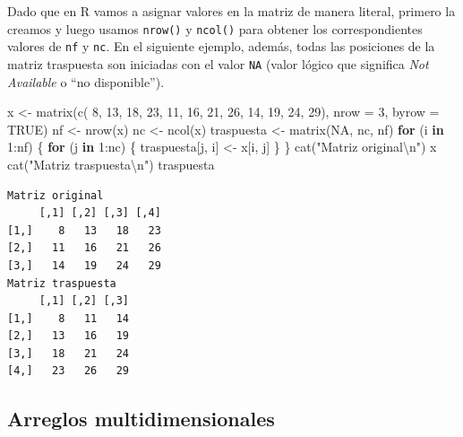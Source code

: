 \documentclass[
]{book}
\newenvironment{Shaded}{\begin{snugshade}}{\end{snugshade}}
\newcommand{\AttributeTok}[1]{\textcolor[rgb]{0.77,0.63,0.00}{#1}}
\newcommand{\ConstantTok}[1]{\textcolor[rgb]{0.00,0.00,0.00}{#1}}
\newcommand{\ControlFlowTok}[1]{\textcolor[rgb]{0.13,0.29,0.53}{\textbf{#1}}}
\newcommand{\DecValTok}[1]{\textcolor[rgb]{0.00,0.00,0.81}{#1}}
\newcommand{\FunctionTok}[1]{\textcolor[rgb]{0.00,0.00,0.00}{#1}}
\newcommand{\NormalTok}[1]{#1}
\newcommand{\OtherTok}[1]{\textcolor[rgb]{0.56,0.35,0.01}{#1}}
\newcommand{\SpecialCharTok}[1]{\textcolor[rgb]{0.00,0.00,0.00}{#1}}
\newcommand{\StringTok}[1]{\textcolor[rgb]{0.31,0.60,0.02}{#1}}
\begin{document}
Dado que en R vamos a asignar valores en la matriz de manera literal, primero la creamos y luego usamos \texttt{nrow()} y \texttt{ncol()} para obtener los correspondientes valores de \texttt{nf} y \texttt{nc}. En el siguiente ejemplo, además, todas las posiciones de la matriz traspuesta son iniciadas con el valor \texttt{NA} (valor lógico que significa \emph{Not Available} o ``no disponible'').

\begin{Shaded}
\begin{Highlighting}[]
\NormalTok{x }\OtherTok{\textless{}{-}} \FunctionTok{matrix}\NormalTok{(}\FunctionTok{c}\NormalTok{( }\DecValTok{8}\NormalTok{, }\DecValTok{13}\NormalTok{, }\DecValTok{18}\NormalTok{, }\DecValTok{23}\NormalTok{, }
              \DecValTok{11}\NormalTok{, }\DecValTok{16}\NormalTok{, }\DecValTok{21}\NormalTok{, }\DecValTok{26}\NormalTok{, }
              \DecValTok{14}\NormalTok{, }\DecValTok{19}\NormalTok{, }\DecValTok{24}\NormalTok{, }\DecValTok{29}\NormalTok{), }
            \AttributeTok{nrow =} \DecValTok{3}\NormalTok{, }\AttributeTok{byrow =} \ConstantTok{TRUE}\NormalTok{)}
\NormalTok{nf }\OtherTok{\textless{}{-}} \FunctionTok{nrow}\NormalTok{(x)}
\NormalTok{nc }\OtherTok{\textless{}{-}} \FunctionTok{ncol}\NormalTok{(x)}
\NormalTok{traspuesta }\OtherTok{\textless{}{-}} \FunctionTok{matrix}\NormalTok{(}\ConstantTok{NA}\NormalTok{, nc, nf)}
\ControlFlowTok{for}\NormalTok{ (i }\ControlFlowTok{in} \DecValTok{1}\SpecialCharTok{:}\NormalTok{nf) \{}
    \ControlFlowTok{for}\NormalTok{ (j }\ControlFlowTok{in} \DecValTok{1}\SpecialCharTok{:}\NormalTok{nc) \{}
\NormalTok{        traspuesta[j, i] }\OtherTok{\textless{}{-}}\NormalTok{ x[i, j]}
\NormalTok{    \}}
\NormalTok{\}}
\FunctionTok{cat}\NormalTok{(}\StringTok{"Matriz original}\SpecialCharTok{\textbackslash{}n}\StringTok{"}\NormalTok{)}
\NormalTok{x}
\FunctionTok{cat}\NormalTok{(}\StringTok{"Matriz traspuesta}\SpecialCharTok{\textbackslash{}n}\StringTok{"}\NormalTok{)}
\NormalTok{traspuesta}
\end{Highlighting}
\end{Shaded}

\begin{verbatim}
Matriz original
     [,1] [,2] [,3] [,4]
[1,]    8   13   18   23
[2,]   11   16   21   26
[3,]   14   19   24   29
Matriz traspuesta
     [,1] [,2] [,3]
[1,]    8   11   14
[2,]   13   16   19
[3,]   18   21   24
[4,]   23   26   29
\end{verbatim}

\hypertarget{arreglos-multidimensionales}{%
\subsection{Arreglos multidimensionales}\label{arreglos-multidimensionales}}
\end{document}
